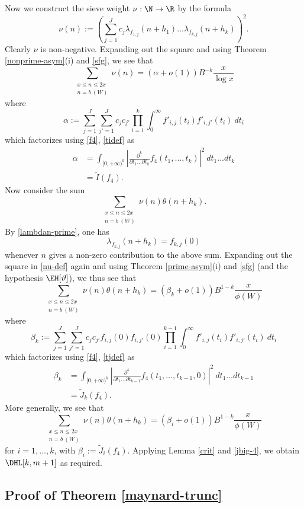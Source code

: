 Now we construct the sieve weight $\nu: \N \to \R$ by the formula
\begin{equation}\label{nu-def}
 \nu(n) := \left( \sum_{j=1}^J c_j \lambda_{f_{1,j}}(n+h_1) \dots \lambda_{f_{k,j}}(n+h_k) \right)^2.
\end{equation}
Clearly $\nu$ is non-negative.  Expanding out the square and using Theorem \ref{nonprime-asym}(i) and \eqref{sfg}, we see that
$$ \sum_{\substack{x \leq n \leq 2x\\ n = b\ (W)}} \nu(n) = (\alpha + o(1)) B^{-k} \frac{x}{\log x}$$
where
$$ \alpha := \sum_{j=1}^J \sum_{j'=1}^J c_j c_{j'} \prod_{i=1}^k \int_0^\infty f'_{i,j}(t_i) f'_{i,j'}(t_i)\ dt_i$$
which factorizes using \eqref{f4}, \eqref{tidef} as
\begin{align*}
\alpha &= \int_{[0,+\infty)^k} |\frac{\partial^k}{\partial t_1 \dots \partial t_k} f_4(t_1,\dots,t_k)|^2\ dt_1 \dots dt_k \\
&= \tilde I(f_4).
\end{align*}
Now consider the sum
$$ \sum_{\substack{x \leq n \leq 2x\\ n = b\ (W)}} \nu(n) \theta(n+h_k).$$
By \eqref{lambdan-prime}, one has
$$ \lambda_{f_{k,j}}(n+h_k) = f_{k,j}(0)$$
whenever $n$ gives a non-zero contribution to the above sum.  Expanding out the square in \eqref{nu-def} again and using Theorem \ref{prime-asym}(i) and \eqref{sfg} (and the hypothesis $\EH[\vartheta]$), we thus see that
$$ \sum_{\substack{x \leq n \leq 2x\\ n = b\ (W)}} \nu(n) \theta(n+h_k) = (\beta_k + o(1)) B^{1-k} \frac{x}{\phi(W)}$$
where
$$ \beta_k := \sum_{j=1}^J \sum_{j'=1}^J c_j c_{j'} f_{i,j}(0) f_{i,j'}(0) \prod_{i=1}^{k-1} \int_0^\infty f'_{i,j}(t_i) f'_{i,j'}(t_i)\ dt_i$$
which factorizes using \eqref{f4}, \eqref{tjdef} as
\begin{align*}
\beta_k &= \int_{[0,+\infty)^k} |\frac{\partial^k}{\partial t_1 \dots \partial t_{k-1}} f_4(t_1,\dots,t_{k-1},0)|^2\ dt_1 \dots dt_{k-1} \\
&= \tilde J_k(f_4).
\end{align*}
More generally, we see that
$$ \sum_{\substack{x \leq n \leq 2x\\ n = b\ (W)}} \nu(n) \theta(n+h_k) = (\beta_i + o(1)) B^{1-k} \frac{x}{\phi(W)}$$
for $i=1,\dots,k$, with $\beta_i := \tilde J_i(f_4)$.  Applying Lemma \ref{crit} and \eqref{jbig-4}, we obtain $\DHL[k,m+1]$ as required.

\subsection{Proof of Theorem \ref{maynard-trunc}}\label{trunc-sec}

